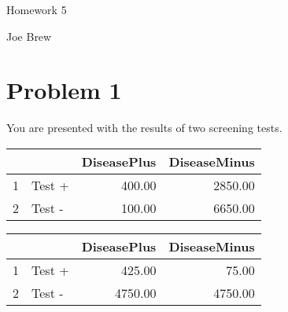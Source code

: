 \documentclass[12pt]{article}
\begin{document}

\fancyhfoffset[O,O]{0pt}


\begin{center}
\begin{huge}
Homework 5 \\
\end{huge}
\begin{large}
Joe Brew \\
\end{large}
\end{center}

\vspace{20mm}

\section*{Problem 1}

You are presented with the results of two screening tests.  



\begin{multicols}{2}

\begin{table}[H]
\caption*{Test A}
\begin{table}[ht]
\centering
\begin{tabular}{rlrr}
  \hline
 &   & DiseasePlus & DiseaseMinus \\ 
  \hline
1 & Test + & 400.00 & 2850.00 \\ 
  2 & Test - & 100.00 & 6650.00 \\ 
   \hline
\end{tabular}
\end{table}\end{table}

\begin{table}[H]
\caption*{Test B}
\begin{table}[ht]
\centering
\begin{tabular}{rlrr}
  \hline
 &   & DiseasePlus & DiseaseMinus \\ 
  \hline
1 & Test + & 425.00 & 75.00 \\ 
  2 & Test - & 4750.00 & 4750.00 \\ 
   \hline
\end{tabular}
\end{table}\end{table}

\end{multicols}
\end{document}
